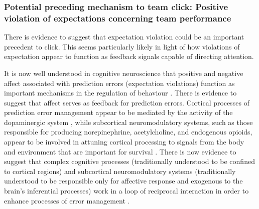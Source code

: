 \begin{CJK}{UTF8}{gbsn}



\subsubsection{Potential preceding mechanism to team click: Positive violation of expectations concerning team performance}


There is evidence to suggest that expectation violation could be an important precedent to click. This seems particularly likely in light of how violations of expectation appear to function as feedback signals capable of directing attention.

It is now well understood in cognitive neuroscience that positive and negative affect associated with prediction errors (expectation violations) function as important mechanisms in the regulation of behaviour \citep{Pessiglione2006,Haggard2008}.  There is evidence to suggest that affect serves as feedback for prediction errors.  Cortical processes of prediction error management appear to be mediated by the activity of the dopaminergic system \citep{Schultz2016,Friston2012}, while subcortical neuromodulatory systems, such as those responsible for producing norepinephrine, acetylcholine, and endogenous opioids, appear to be involved in attuning cortical processing to signals from the body and environment that are important for survival \citep{Lewis2005}.  There is now evidence to suggest that complex cognitive processes (traditionally understood to be confined to cortical regions) and subcortical neuromodulatory systems (traditionally understood to be responsible only for affective response and exogenous to the brain's inferential processes) work in a loop of reciprocal interaction in order to enhance processes of error management \citep{Damasio1994,Lewis2005,Miller2017,Barrett2017}.


\end{CJK}
